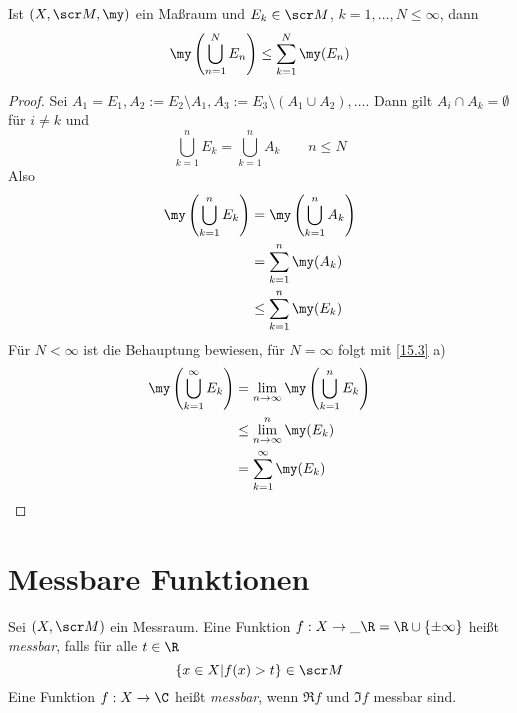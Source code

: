 \documentclass[a4paper,10pt]{scrbook}
\begin{document}
\begin{lem}
	\label{15.4}
	Ist $(X,\scr M,\my)$ ein Maßraum und $E_k\in \scr M$, $k=1,\dotsc, N\le \infty$, dann
	\[
		\my\left(\bigcup_{n=1}^N E_n\right) \le \sum_{k=1}^N \my(E_n)
	\]
	\begin{proof}
		Sei $A_1=E_1, A_2 := E_2 \setminus A_1, A_3 := E_3 \setminus (A_1\cup A_2), \dotsc $.
		Dann gilt $A_i \cap A_k = \emptyset$ für $i\neq k$ und
		\[
			\bigcup_{k=1}^n E_k = \bigcup_{k=1}^n A_k \qquad n\le N
		\]
		Also
		\begin{align*}
		\my\left(\bigcup_{k=1}^n E_k\right) &= \my\left( \bigcup_{k=1}^n A_k\right)\\
																														&=\sum_{k=1}^n \my(A_k) \\
									   &\le \sum_{k=1}^n \my(E_k)
		\end{align*}
		Für $N< \infty$ ist die Behauptung bewiesen, für $N=\infty$ folgt mit \ref{15.3} a)
		\begin{align*}
			\my\left(\bigcup_{k=1}^\infty E_k\right) &= \lim_{n\to\infty}\my\left(\bigcup_{k=1}^n E_k\right) \\
																								   &\le \lim_{n\to \infty}^n\my(E_k) \\
									&=\sum_{k=1}^\infty \my(E_k)
		\end{align*}
	\end{proof}
\end{lem}


\section{Messbare Funktionen}

\begin{df*}
	Sei $(X,\scr M)$ ein Messraum.
	Eine Funktion $f: X\to \_\R = \R\cup \{\pm \infty\}$ heißt \emph{messbar}, falls für alle $t\in \R$
	\[
		\{x\in X|f(x)>t\} \in \scr M
	\]
	Eine Funktion $f:X\to \C$ heißt \emph{messbar}, wenn $\Re f$ und $\Im f$ messbar sind.
\end{df*}
\end{document}
